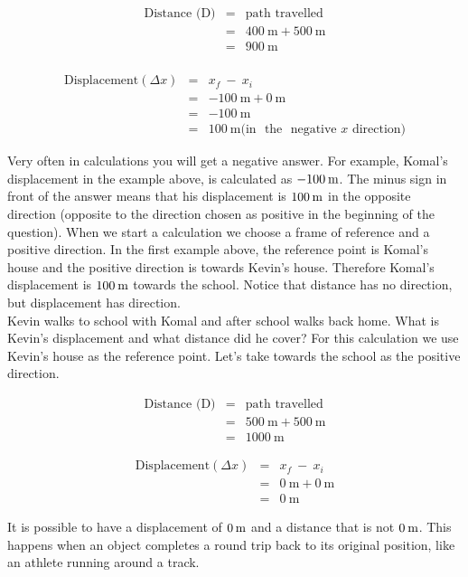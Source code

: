 \begin{minipage}{0.5\textwidth}
\begin{eqnarray*}
\text{Distance (D)} &=& \text{path~travelled}\\
&=&400\ \text{m} + 500\ \text{m}\\
&=&900\ \text{m}\\
\end{eqnarray*}
\end{minipage}
\begin{minipage}{0.5\textwidth}
\begin{eqnarray*}
\text{Displacement} (\Delta x) &=& x_f~ - ~ x_i\\
&=&-100\ \text{m} + 0\ \text{m}\\
&=&-100\ \text{m}\\
&=&100\ \text{m} \text{(in ~the~ negative~} x \text{~direction)}
\end{eqnarray*}
\end{minipage}
      \label{m38788*eip-883}
Very often in calculations you will get a negative answer. For example, Komal's displacement in the example above, is calculated as $-100\phantom{\rule{2pt}{0ex}}\text{m}$. The minus sign in front of the answer means that his displacement is $100\phantom{\rule{2pt}{0ex}}\text{m}$ in the opposite direction (opposite to the direction chosen as positive in the beginning of the question). When we start a calculation we choose a frame of reference and a positive direction. In the first example above, the reference point is Komal's house and the positive direction is towards Kevin's house. Therefore Komal's displacement is $100\phantom{\rule{2pt}{0ex}}\text{m}$ towards the school. Notice that distance has no direction, but displacement has direction.\\
      \label{m38788*id63667}Kevin walks to school with Komal and after school walks back home. What is Kevin's displacement and what distance did he cover?
For this calculation we use Kevin's house as the reference point. Let's take towards the school as the positive direction.\\
\begin{minipage}{0.5\textwidth}
\begin{eqnarray*}
\text{Distance (D)} &=& \text{path~travelled}\\
&=&500\ \text{m} + 500\ \text{m}\\
&=&1000\ \text{m}
\end{eqnarray*}
\end{minipage}
\begin{minipage}{0.5\textwidth}
\begin{eqnarray*}
\text{Displacement} (\Delta x) &=& x_f~ - ~ x_i\\
&=&0\ \text{m} + 0\ \text{m}\\
&=&0\ \text{m}
\end{eqnarray*}
\end{minipage} 
      \label{m38788*id63886}It is possible to have a displacement of $0\phantom{\rule{2pt}{0ex}}\text{m}$ and a distance that is not $0\phantom{\rule{2pt}{0ex}}\text{m}$. This happens when an object completes a round trip back to its original position, like an athlete running around a track.\par 

